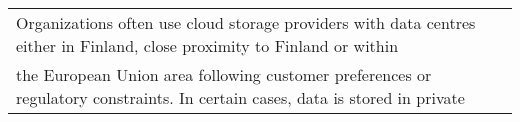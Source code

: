 \begin{table*}[t]
\begin{tabular}{p{}p{2cm}p{}p{}p{2cm}p{1cm}p{}}
       
    \multicolumn{7}{l}{
    Organizations often use cloud storage providers with data centres  either in Finland, close proximity to Finland or within}\\
    
    \multicolumn{7}{l}{the European Union area following customer preferences or regulatory constraints. In certain cases, data is stored in private }\\
    
    \end{tabular}%
  \label{tab:data_source_storage_mlframeworks_interviewees}%
\end{table*}%